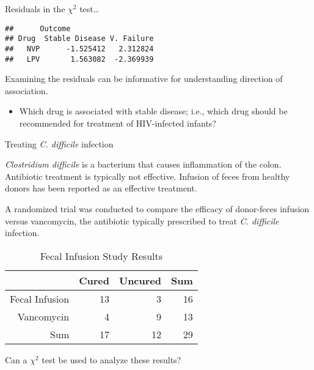 \documentclass[
  ignorenonframetext,
  aspectratio=169]{beamer}
\newenvironment{Shaded}{\begin{snugshade}}{\end{snugshade}}
\newcommand{\FunctionTok}[1]{\textcolor[rgb]{0.13,0.29,0.53}{\textbf{#1}}}
\newcommand{\NormalTok}[1]{#1}
\newcommand{\SpecialCharTok}[1]{\textcolor[rgb]{0.81,0.36,0.00}{\textbf{#1}}}
\providecommand{\tightlist}{%
  \setlength{\itemsep}{0pt}\setlength{\parskip}{0pt}}
\begin{document}
\begin{frame}[fragile]{Residuals in the \(\chi^2\) test\ldots{}}
\protect\hypertarget{residuals-in-the-chi2-test-1}{}
\footnotesize

\begin{Shaded}
\end{Shaded}

\begin{verbatim}
##      Outcome
## Drug  Stable Disease V. Failure
##   NVP      -1.525412   2.312824
##   LPV       1.563082  -2.369939
\end{verbatim}

\small

Examining the residuals can be informative for understanding direction
of association.

\begin{itemize}
\tightlist
\item
  Which drug is associated with stable disease; i.e., which drug should
  be recommended for treatment of HIV-infected infants?
\end{itemize}
\end{frame}

\begin{frame}{Treating \emph{C. difficile} infection}
\protect\hypertarget{treating-c.-difficile-infection}{}
\small

\emph{Clostridium difficile} is a bacterium that causes inflammation of
the colon. Antibiotic treatment is typically not effective. Infusion of
feces from healthy donors has been reported as an effective treatment.

A randomized trial was conducted to compare the efficacy of donor-feces
infusion versus vancomycin, the antibiotic typically prescribed to treat
\emph{C. difficile} infection.

\begin{table}[h]
    \centering
    \begin{tabular}{rrrr}
        \hline
        & Cured & Uncured & Sum \\ 
        \hline
        Fecal Infusion & 13 & 3 & 16 \\ 
        Vancomycin & 4 & 9 & 13 \\ 
        Sum & 17 & 12 & 29 \\ 
        \hline
    \end{tabular}
    \caption{Fecal Infusion Study Results} 
    \label{fecalStudyResultsTest}
\end{table}

Can a \(\chi^2\) test be used to analyze these results?
\end{frame}
\end{document}
